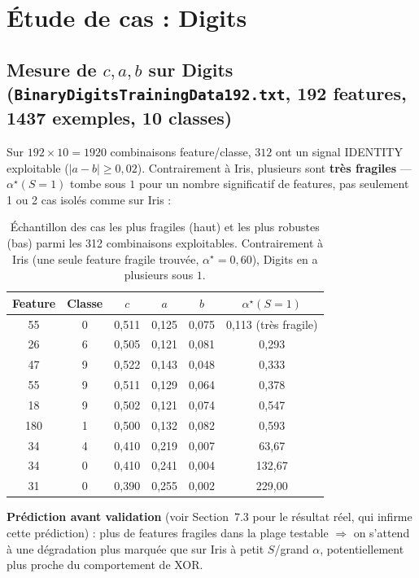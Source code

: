 \documentclass[12pt,a4paper]{article}
\theoremstyle{remark}
\begin{document}
\section{Étude de cas : Digits}

\subsection{Mesure de $c,a,b$ sur Digits (\texttt{BinaryDigitsTrainingData192.txt},
192 features, 1437 exemples, 10 classes)}

Sur $192\times10=1920$ combinaisons feature/classe, $312$ ont un signal IDENTITY
exploitable ($|a-b|\ge0{,}02$). Contrairement à Iris, plusieurs sont
\textbf{très fragiles} --- $\alpha^\star(S{=}1)$ tombe sous $1$ pour un nombre
significatif de features, pas seulement 1 ou 2 cas isolés comme sur Iris :

\begin{table}[h]
\centering
\renewcommand{\arraystretch}{1.2}
\begin{tabular}{cccccc}
\toprule
Feature & Classe & $c$ & $a$ & $b$ & $\alpha^\star(S{=}1)$ \\
\midrule
55  & 0 & 0,511 & 0,125 & 0,075 & 0,113 (très fragile) \\
26  & 6 & 0,505 & 0,121 & 0,081 & 0,293 \\
47  & 9 & 0,522 & 0,143 & 0,048 & 0,333 \\
55  & 9 & 0,511 & 0,129 & 0,064 & 0,378 \\
18  & 9 & 0,502 & 0,121 & 0,074 & 0,547 \\
180 & 1 & 0,500 & 0,132 & 0,082 & 0,593 \\
\midrule
34  & 4 & 0,410 & 0,219 & 0,007 & 63,67 \\
34  & 0 & 0,410 & 0,241 & 0,004 & 132,67 \\
31  & 0 & 0,390 & 0,255 & 0,002 & 229,00 \\
\bottomrule
\end{tabular}
\caption{Échantillon des cas les plus fragiles (haut) et les plus robustes (bas)
parmi les 312 combinaisons exploitables. Contrairement à Iris (une seule feature
fragile trouvée, $\alpha^\star{=}0{,}60$), Digits en a plusieurs sous $1$.}
\end{table}

\textbf{Prédiction avant validation} (voir Section~7.3 pour le résultat réel,
qui infirme cette prédiction) : plus de features fragiles dans la plage
testable $\Rightarrow$ on s'attend à une dégradation plus marquée que sur Iris à
petit $S$/grand $\alpha$, potentiellement plus proche du comportement de XOR.
\end{document}
